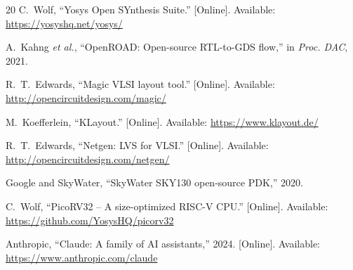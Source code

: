 \documentclass[journal]{IEEEtran}
\begin{document}
\begin{thebibliography}{20}
 C.~Wolf, ``Yosys Open SYnthesis Suite.'' [Online]. Available: \url{https://yosyshq.net/yosys/}

 A.~Kahng \emph{et al.}, ``OpenROAD: Open-source RTL-to-GDS flow,'' in \emph{Proc. DAC}, 2021.

 R.~T.~Edwards, ``Magic VLSI layout tool.'' [Online]. Available: \url{http://opencircuitdesign.com/magic/}

 M.~Koefferlein, ``KLayout.'' [Online]. Available: \url{https://www.klayout.de/}

 R.~T.~Edwards, ``Netgen: LVS for VLSI.'' [Online]. Available: \url{http://opencircuitdesign.com/netgen/}

 {Google and SkyWater}, ``SkyWater SKY130 open-source PDK,'' 2020.

 C.~Wolf, ``PicoRV32 -- A size-optimized RISC-V CPU.'' [Online]. Available: \url{https://github.com/YosysHQ/picorv32}

 Anthropic, ``Claude: A family of AI assistants,'' 2024. [Online]. Available: \url{https://www.anthropic.com/claude}

\end{thebibliography}
\end{document}
